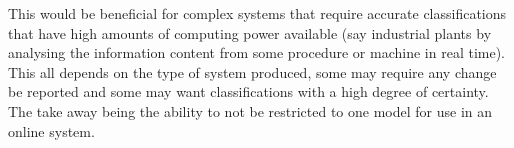 This would be beneficial for complex systems that require accurate classifications that have high amounts of computing power available (say industrial plants by analysing the information content from some procedure or machine in real time). This all depends on the type of system produced, some may require any change be reported and some may want classifications with a high degree of certainty. The take away being the ability to not be restricted to one model for use in an online system.\\








